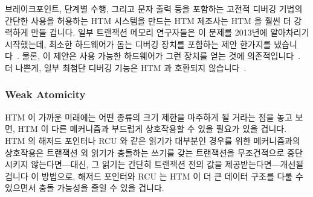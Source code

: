 브레이크포인트, 단계별 수행, 그리고 문자 출력 등을 포함하는 고전적 디버깅
기법의 간단한 사용을 허용하는 HTM 시스템을 만드는 HTM 제조사는 HTM 을 훨씬 더
강력하게 만들 겁니다.
일부 트랜잭션 메모리 연구자들은 이 문제를 2013년에 알아차리기 시작했는데,
최소한 하드웨어가 돕는 디버깅 장치를 포함하는 제안 한가지를
냈습니다~\cite{JustinGottschlich2013TMdebug}.
물론, 이 제안은 사용 가능한 하드웨어가 그런 장치를 얻는 것에
의존적입니다~\cite{TimothyHayes2020ARM-HTM,Intel2020TSXdevguide}.
더 나쁜게, 일부 최첨단 디버깅 기능은 HTM 과 호환되지
않습니다~\cite{RobertOCallahan2020DebuggingHTM}.

\iffalse

Another inhibitor to transaction size is the need to debug the transactions.
The problem with current mechanisms is that a single-step exception
aborts the enclosing transaction.
There are a number of workarounds for this issue, including emulating
the processor (slow!), substituting STM for HTM (slow and slightly
different semantics!),
playback techniques using repeated retries to emulate forward
progress (strange failure modes!), and
full support of debugging HTM transactions (complex!).

Should one of the HTM vendors produce an HTM system that allows
straightforward use of classical debugging techniques within
transactions, including breakpoints, single stepping, and
print statements, this will make HTM much more compelling.
Some transactional-memory researchers started to recognize this
problem in 2013, with at least one proposal involving hardware-assisted
debugging facilities~\cite{JustinGottschlich2013TMdebug}.
Of course, this proposal depends on readily available hardware gaining such
facilities~\cite{TimothyHayes2020ARM-HTM,Intel2020TSXdevguide}.
Worse yet, some cutting-edge debugging facilities are incompatible
with HTM~\cite{RobertOCallahan2020DebuggingHTM}.

\fi

\subsubsection{Weak Atomicity}
\label{sec:future:Weak Atomicity}

HTM 이 가까운 미래에는 어떤 종류의 크기 제한을 마주하게 될 거라는 점을 놓고
보면, HTM 이 다른 메커니즘과 부드럽게 상호작용할 수 있을 필요가 있을 겁니다.
HTM 의 해저드 포인터나 RCU 와 같은 읽기가 대부분인 경우를 위한 메커니즘과의
상호작용은 트랜잭션 외 읽기가 충돌하는 쓰기를 갖는 트랜잭션을 무조건적으로
중단시키지 않는다면---대신, 그 읽기는 간단히 트랜잭션 전의 값을
제공받는다면---개선될 겁니다
이 방법으로, 해저드 포인터와 RCU 는 HTM 이 더 큰 데이터 구조를 다룰 수 있으면서
충돌 가능성을 줄일 수 있을 겁니다.

